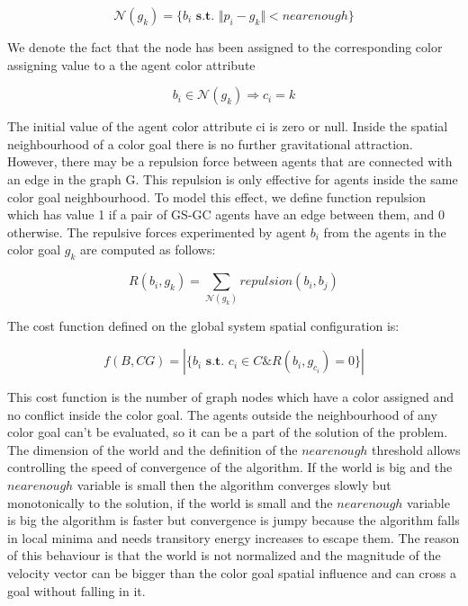 \begin{equation}
\mathcal{N} \left( g_k \right) = \lbrace b_i \textbf{ s.t. } \Vert p_i - g_k \Vert < nearenough \rbrace
\end{equation}

We denote the fact that the node has been assigned to the corresponding color assigning value to a the agent color attribute

\begin{equation}
b_i \in \mathcal{N}\left( g_k \right) \Rightarrow c_i = k
\end{equation}

The initial value of the agent color attribute ci is zero or null. Inside the spatial neighbourhood of a color goal there is no further gravitational attraction. However, there may be a repulsion force between agents that are connected with an edge in the graph G. This repulsion is only effective for agents inside the same color goal neighbourhood. To model this effect, we define function repulsion which has value 1 if a pair of GS-GC agents have an edge between them, and 0 otherwise. The repulsive forces experimented by agent $b_i$ from the agents in the color goal $g_k$ are computed as follows:

\begin{equation}
R \left( b_i, g_k \right) = \sum\limits_{\mathcal{N}\left( g_k \right)} repulsion \left( b_i, b_j \right)
\end{equation}

The cost function defined on the global system spatial configuration is:

\begin{equation}
f \left( B, CG \right) = | \lbrace b_i \textbf{ s.t. } c_i \in C \& R \left(b_i, g_{c_i} \right) = 0 \rbrace |
\end{equation}

This cost function is the number of graph nodes which have a color assigned and no conflict inside the color goal. The agents outside the neighbourhood of any color goal can't be evaluated, so it can be a part of the solution of the problem. The dimension of the world and the definition of the $nearenough$ threshold allows controlling the speed of convergence of the algorithm. If the world is big and the $nearenough$ variable is small then the algorithm converges slowly but monotonically to the solution, if the world is small and the $nearenough$ variable is big the algorithm is faster but convergence is jumpy because the algorithm falls in local minima and needs transitory energy increases to escape them. The reason of this behaviour is that the world is not normalized and the magnitude of the velocity vector can be bigger than the color goal spatial influence and can cross a goal without falling in it.
